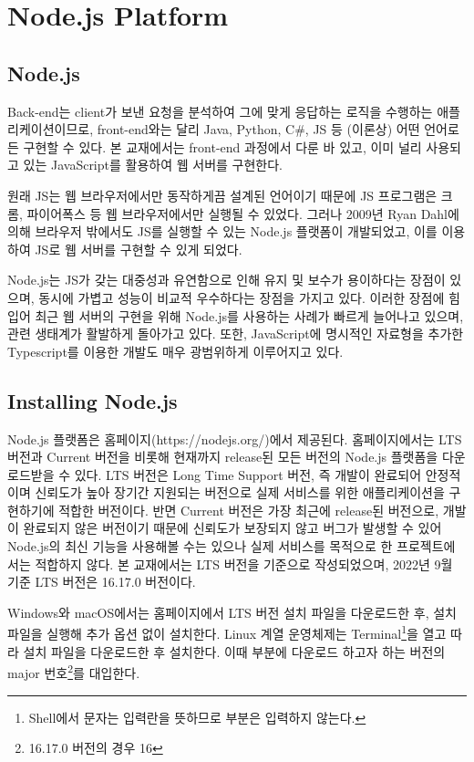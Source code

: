 \section{Node.js Platform}\label{sect:node-js}

\subsection*{Node.js}

Back-end는 client가 보낸 요청을 분석하여 그에 맞게 응답하는 로직을 수행하는 애플리케이션이므로, front-end와는 달리 Java, Python, C\#, JS 등 (이론상) 어떤 언어로든 구현할 수 있다. 본 교재에서는 front-end 과정에서 다룬 바 있고, 이미 널리 사용되고 있는 JavaScript를 활용하여 웹 서버를 구현한다.

원래 JS는 웹 브라우저에서만 동작하게끔 설계된 언어이기 때문에 JS 프로그램은 크롬, 파이어폭스 등 웹 브라우저에서만 실행될 수 있었다. 그러나 2009년 Ryan Dahl에 의해 브라우저 밖에서도 JS를 실행할 수 있는 Node.js 플랫폼이 개발되었고, 이를 이용하여 JS로 웹 서버를 구현할 수 있게 되었다.

Node.js는 JS가 갖는 대중성과 유연함으로 인해 유지 및 보수가 용이하다는 장점이 있으며, 동시에 가볍고 성능이 비교적 우수하다는 장점을 가지고 있다. 이러한 장점에 힘입어 최근 웹 서버의 구현을 위해 Node.js를 사용하는 사례가 빠르게 늘어나고 있으며, 관련 생태계가 활발하게 돌아가고 있다. 또한, JavaScript에 명시적인 자료형을 추가한 Typescript를 이용한 개발도 매우 광범위하게 이루어지고 있다.

\subsection*{Installing Node.js}

Node.js 플랫폼은 홈페이지(https://nodejs.org/)에서 제공된다. 홈페이지에서는 LTS 버전과 Current 버전을 비롯해 현재까지 release된 모든 버전의 Node.js 플랫폼을 다운로드받을 수 있다. LTS 버전은 Long Time Support 버전, 즉 개발이 완료되어 안정적이며 신뢰도가 높아 장기간 지원되는 버전으로 실제 서비스를 위한 애플리케이션을 구현하기에 적합한 버전이다. 반면 Current 버전은 가장 최근에 release된 버전으로, 개발이 완료되지 않은 버전이기 때문에 신뢰도가 보장되지 않고 버그가 발생할 수 있어 Node.js의 최신 기능을 사용해볼 수는 있으나 실제 서비스를 목적으로 한 프로젝트에서는 적합하지 않다. 본 교재에서는 LTS 버전을 기준으로 작성되었으며, 2022년 9월 기준 LTS 버전은 16.17.0 버전이다.

Windows와 macOS에서는 홈페이지에서 LTS 버전 설치 파일을 다운로드한 후, 설치 파일을 실행해 추가 옵션 없이 설치한다. Linux 계열 운영체제는 Terminal\footnote{Shell에서 \cd{\$} 문자는 입력란을 뜻하므로 \cd{\$ } 부분은 입력하지 않는다.}을 열고 \을 따라 설치 파일을 다운로드한 후 설치한다. 이때  부분에 다운로드 하고자 하는 버전의 major 번호\footnote{16.17.0 버전의 경우 16}를 대입한다.

